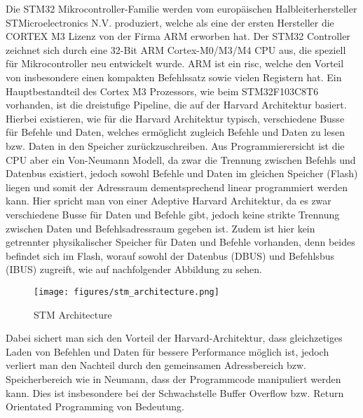 \documentclass[a4paper,
DIV=13,
12pt,
BCOR=10mm,
department=FakIM,
oneside,
parskip=half,
automark,
listof=totocnumbered,
bibliography=totocnumbered,
acronym=totocnumbered
] {OTHRartcl}
\begin{document}
Die STM32 Mikrocontroller-Familie werden vom europäischen Halbleiterhersteller STMicroelectronics N.V. produziert, welche als eine der ersten Hersteller
die CORTEX M3 Lizenz von der Firma ARM erworben hat.
Der STM32 Controller zeichnet sich durch eine 32-Bit ARM Cortex-M0/M3/M4 CPU aus, die speziell für Mikrocontroller neu entwickelt wurde.
ARM ist ein \ac{risc}, welche den Vorteil von insbesondere einen kompakten Befehlssatz sowie vielen Registern hat.
Ein Hauptbestandteil des Cortex M3 Prozessors, wie beim STM32F103C8T6 vorhanden, ist die dreistufige Pipeline, die auf der Harvard Architektur basiert.
Hierbei existieren, wie für die Harvard Architektur typisch, verschiedene Busse für Befehle und Daten, welches ermöglicht zugleich Befehle und Daten zu lesen bzw. Daten in den Speicher zurückzuschreiben.
Aus Programmierersicht ist die CPU aber ein Von-Neumann Modell, da zwar die Trennung zwischen Befehls und Datenbus existiert, jedoch sowohl Befehle und Daten im gleichen Speicher (Flash) liegen und
somit der Adressraum dementsprechend linear programmiert werden kann.
Hier spricht man von einer Adeptive Harvard Architektur, da es zwar verschiedene Busse für Daten und Befehle gibt, jedoch keine strikte Trennung zwischen Daten und Befehlsadressraum gegeben ist.
Zudem ist hier kein getrennter physikalischer Speicher für Daten und Befehle vorhanden, denn beides befindet sich im Flash, worauf sowohl der Datenbus (DBUS) und Befehlsbus (IBUS) zugreift, wie auf
nachfolgender Abbildung zu sehen.
\begin{figure}[ht!]
  \begin{center}
    \texttt{[image: figures/stm\_architecture.png]}
    \caption{STM Architecture}
    \label{fig: STM Architektur}
  \end{center}
\end{figure}
Dabei sichert man sich den Vorteil der Harvard-Architektur, dass gleichzetiges Laden von Befehlen und Daten für bessere Performance möglich ist, jedoch
verliert man den Nachteil durch den gemeinsamen Adressbereich bzw. Speicherbereich wie in Neumann, dass der Programmcode manipuliert werden kann.
Dies ist insbesondere bei der Schwachstelle Buffer Overflow bzw. Return Orientated Programming von Bedeutung.
\end{document}
